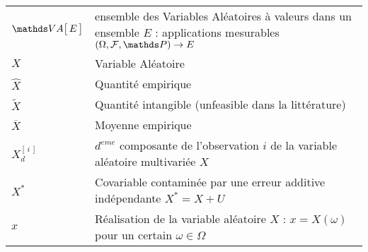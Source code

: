 \begin{tabularx}{\linewidth}{lX}
	\midrule
	$\VA{E}$                                                                         & ensemble des Variables Aléatoires à valeurs dans un ensemble $E$ : applications mesurables $(\Omega, \calF, \P) \rightarrow E$                                                                                                                      \\
	$X$                                                                              & Variable Aléatoire                                                                                                                                                                                                                                  \\
	$\widehat{X}$                                                                    & Quantité empirique                                                                                                                                                                                                                                  \\
	$\widetilde{X}$                                                                  & Quantité intangible (\og unfeasible \fg dans la littérature)                                                                                                                                                                                        \\
	$\overline{X}$                                                                   & Moyenne empirique                                                                                                                                                                                                                                   \\
	$X_d^{[ \, i \,]}$                                                               & $d^{eme}$ composante de l'observation $i$ de la variable aléatoire multivariée $X$                                                                                                                                                                  \\
	$X^*$ & Covariable contaminée par une erreur additive indépendante $X^* = X + U$\\
	$x$                                                                              & Réalisation de la variable aléatoire $X$ : $x = X(\omega)$ pour un certain $\omega \in \Omega$                                                                                                                                                      \\

\end{tabularx}
